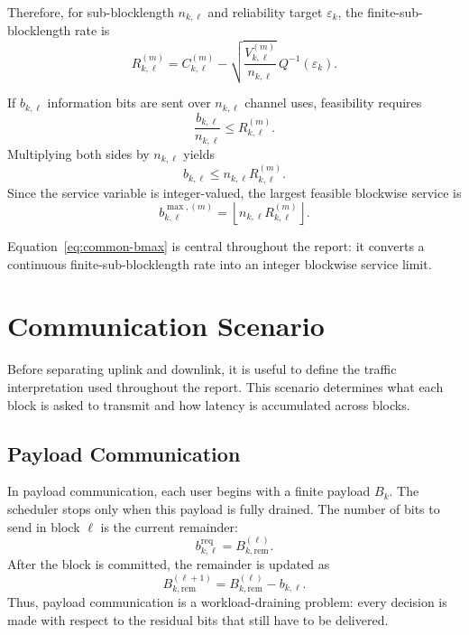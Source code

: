 \documentclass[11pt]{article}
\newcommand{\floor}[1]{\left\lfloor #1 \right\rfloor}
\begin{document}
Therefore, for sub-blocklength $n_{k,\ell}$ and reliability target
$\varepsilon_k$, the finite-sub-blocklength rate is
\begin{equation}
R_{k,\ell}^{(m)}
=
C_{k,\ell}^{(m)}
-
\sqrt{\frac{V_{k,\ell}^{(m)}}{n_{k,\ell}}}\,
Q^{-1}(\varepsilon_k).
\label{eq:common-rate}
\end{equation}

If $b_{k,\ell}$ information bits are sent over $n_{k,\ell}$ channel uses,
feasibility requires
\begin{equation}
\frac{b_{k,\ell}}{n_{k,\ell}}
\le
R_{k,\ell}^{(m)}.
\label{eq:common-feasibility-rate}
\end{equation}
Multiplying both sides by $n_{k,\ell}$ yields
\begin{equation}
b_{k,\ell}
\le
n_{k,\ell}R_{k,\ell}^{(m)}.
\label{eq:common-feasibility-bits}
\end{equation}
Since the service variable is integer-valued, the largest feasible blockwise
service is
\begin{equation}
b_{k,\ell}^{\max,(m)}
=
\floor{n_{k,\ell}R_{k,\ell}^{(m)}}.
\label{eq:common-bmax}
\end{equation}

Equation~\eqref{eq:common-bmax} is central throughout the report: it converts a
continuous finite-sub-blocklength rate into an integer blockwise service limit.

\section{Communication Scenario}

Before separating uplink and downlink, it is useful to define the traffic
interpretation used throughout the report. This scenario determines what each
block is asked to transmit and how latency is accumulated across blocks.

\subsection{Payload Communication}

In payload communication, each user begins with a finite payload
$B_k$. The scheduler stops only when this payload is fully
drained. The number of bits to send in block $\ell$ is the current remainder:
\begin{equation}
b_{k,\ell}^{\mathrm{req}}=B_{k,\mathrm{rem}}^{(\ell)}.
\label{eq:payload-request}
\end{equation}
After the block is committed, the remainder is updated as
\begin{equation}
B_{k,\mathrm{rem}}^{(\ell+1)}=B_{k,\mathrm{rem}}^{(\ell)}-b_{k,\ell}.
\label{eq:payload-update}
\end{equation}
Thus, payload communication is a workload-draining problem: every decision is made
with respect to the residual bits that still have to be delivered.
\end{document}
